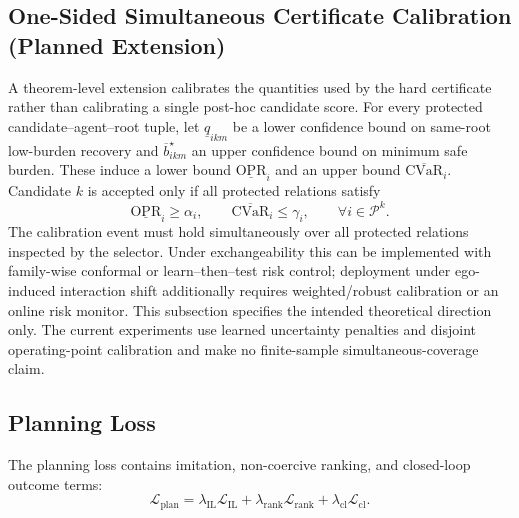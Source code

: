 \documentclass[10pt]{article}
\begin{document}
\subsection{One-Sided Simultaneous Certificate Calibration (Planned Extension)}
\label{app:simultaneous_calibration}

A theorem-level extension calibrates the quantities used by the hard certificate rather than calibrating a single post-hoc candidate score.  For every protected candidate--agent--root tuple, let $\underline q_{ikm}$ be a lower confidence bound on same-root low-burden recovery and $\overline b^{\star}_{ikm}$ an upper confidence bound on minimum safe burden.  These induce a lower bound $\underline{\mathrm{OPR}}_i$ and an upper bound $\overline{\mathrm{CVaR}}_i$.  Candidate $k$ is accepted only if all protected relations satisfy
\begin{equation}
    \underline{\mathrm{OPR}}_i\ge \alpha_i,
    \qquad
    \overline{\mathrm{CVaR}}_i\le \gamma_i,
    \qquad \forall i\in\mathcal P^k.
\end{equation}
The calibration event must hold simultaneously over all protected relations inspected by the selector.  Under exchangeability this can be implemented with family-wise conformal or learn--then--test risk control; deployment under ego-induced interaction shift additionally requires weighted/robust calibration or an online risk monitor.  This subsection specifies the intended theoretical direction only.  The current experiments use learned uncertainty penalties and disjoint operating-point calibration and make no finite-sample simultaneous-coverage claim.

\subsection{Planning Loss}
\label{app:planning_loss}

The planning loss contains imitation, non-coercive ranking, and closed-loop outcome terms:
\begin{equation}
    \mathcal{L}_{\mathrm{plan}}
    =
    \lambda_{\mathrm{IL}}\mathcal{L}_{\mathrm{IL}}
    +
    \lambda_{\mathrm{rank}}\mathcal{L}_{\mathrm{rank}}
    +
    \lambda_{\mathrm{cl}}\mathcal{L}_{\mathrm{cl}}.
\end{equation}
\end{document}
